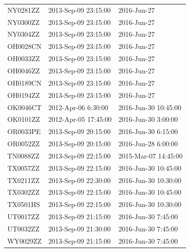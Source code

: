 \documentclass[12pt]{article}
\begin{document}
\begin{longtable}{lll}
NY0281ZZ         & 2013-Sep-09 23:15:00 & 2016-Jun-27          \\
NY0300ZZ         & 2013-Sep-09 23:15:00 & 2016-Jun-27          \\
NY0304ZZ         & 2013-Sep-09 23:15:00 & 2016-Jun-27          \\
OH0028CN         & 2013-Sep-09 23:15:00 & 2016-Jun-27          \\
OH0033ZZ         & 2013-Sep-09 23:15:00 & 2016-Jun-27          \\
OH0046ZZ         & 2013-Sep-09 23:15:00 & 2016-Jun-27          \\
OH0189CN         & 2013-Sep-09 23:15:00 & 2016-Jun-27          \\
OH0194ZZ         & 2013-Sep-09 23:15:00 & 2016-Jun-27          \\
OK0046CT         & 2012-Apr-06 6:30:00  & 2016-Jun-30 10:45:00 \\
OK0101ZZ         & 2012-Apr-05 17:45:00 & 2016-Jun-30 3:00:00  \\
OR0033PE         & 2013-Sep-09 20:15:00 & 2016-Jun-30 6:15:00  \\
OR0052ZZ         & 2013-Sep-09 20:15:00 & 2016-Jun-28 6:00:00  \\
TN0088ZZ         & 2013-Sep-09 22:15:00 & 2015-Mar-07 14:45:00 \\
TX0057ZZ         & 2013-Sep-09 22:15:00 & 2016-Jun-30 10:45:00 \\
TX0211ZZ         & 2013-Sep-09 22:30:00 & 2016-Jun-30 10:30:00 \\
TX0302ZZ         & 2013-Sep-09 22:15:00 & 2016-Jun-30 10:45:00 \\
TX0501HS         & 2013-Sep-09 22:15:00 & 2016-Jun-30 10:30:00 \\
UT0017ZZ         & 2013-Sep-09 21:15:00 & 2016-Jun-30 7:45:00  \\
UT0032ZZ         & 2013-Sep-09 21:30:00 & 2016-Jun-30 7:45:00  \\
WY0029ZZ         & 2013-Sep-09 21:15:00 & 2016-Jun-30 7:45:00 \\
\hline
\end{longtable}
\end{document}
